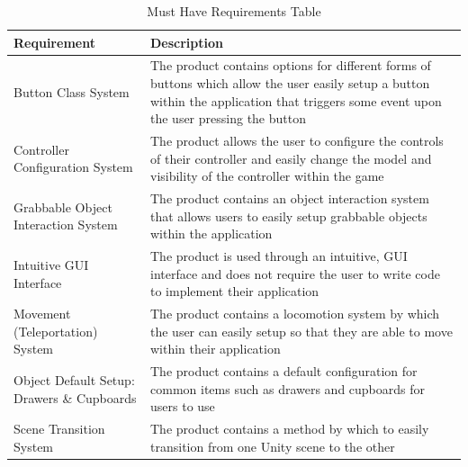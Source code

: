 \documentclass{l4proj}
\begin{document}
\begin{table}[]
    \centering
    \begin{tabular}{ | p{5.5cm} | p{10.5cm} |}
        \hline
        Requirement & Description \\ \hline
        Button Class System & The product contains options for different forms of buttons which allow the user easily setup a button within the application that triggers some event upon the user pressing the button \\ \hline
        Controller Configuration System & The product allows the user to configure the controls of their controller and easily change the model and visibility of the controller within the game \\ \hline
        Grabbable Object Interaction System & The product contains an object interaction system that allows users to easily setup grabbable objects within the application \\ \hline
        Intuitive GUI Interface & The product is used through an intuitive, GUI interface and does not require the user to write code to implement their application \\ \hline
        Movement (Teleportation) System & The product contains a locomotion system by which the user can easily setup so that they are able to move within their application \\ \hline
        Object Default Setup: Drawers \& Cupboards & The product contains a default configuration for common items such as drawers and cupboards for users to use \\ \hline
        Scene Transition System & The product contains a method by which to easily transition from one Unity scene to the other \\ \hline
    \end{tabular}
    \caption{Must Have Requirements Table}
    \label{tab:musthave}
\end{table}
\end{document}
